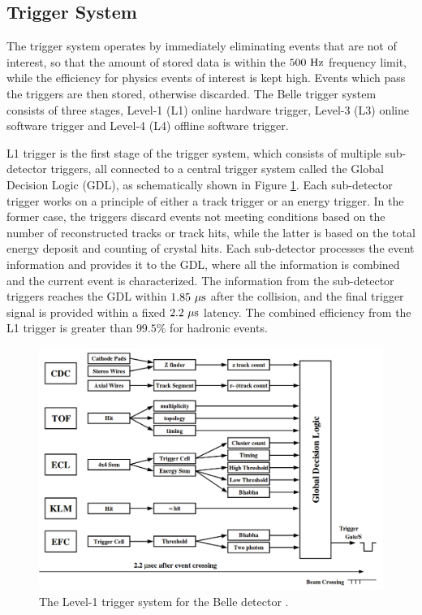 \subsection{Trigger System}
The trigger system operates by immediately eliminating events that are not of interest, so that the amount of stored data is within the $500\mathrm{~Hz}$ frequency limit, while the efficiency for physics events of interest is kept high. Events which pass the triggers are then stored, otherwise discarded. The Belle trigger system consists of three stages, Level-1 (L1) online hardware trigger, Level-3 (L3) online software trigger and Level-4 (L4) offline software trigger.

L1 trigger is the first stage of the trigger system, which consists of multiple sub-detector triggers, all connected to a central trigger system called the Global Decision Logic (GDL), as schematically shown in Figure \ref{fig:TRG_GDL}. Each sub-detector trigger works on a principle of either a track trigger or an energy trigger. In the former case, the triggers discard events not meeting conditions based on the number of reconstructed tracks or track hits, while the latter is based on the total energy deposit and counting of crystal hits. Each sub-detector processes the event information and provides it to the GDL, where all the information is combined and the current event is characterized. The information from the sub-detector triggers reaches the GDL within $1.85\mathrm{~\mu s}$ after the collision, and the final trigger signal is provided within a fixed $2.2\mathrm{~\mu s}$ latency. The combined efficiency from the L1 trigger is greater than $99.5\%$ for hadronic events.

\begin{figure}[H]
	\centering
	\captionsetup{width=0.8\linewidth}
	\includegraphics[width=0.8\linewidth]{fig/setup/TRG_GDL}
	\caption{The Level-1 trigger system for the Belle detector \cite{ABASHIAN2002117}.}
	\label{fig:TRG_GDL}
\end{figure}


